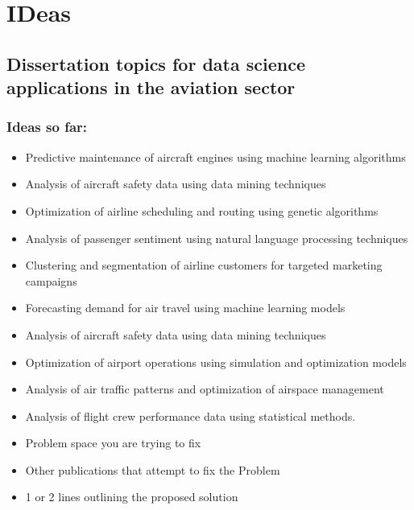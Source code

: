 \chapter{IDeas}

\section{Dissertation topics for data science applications in the aviation sector}

\subsection{Ideas so far:}
\begin{itemize}
    \item Predictive maintenance of aircraft engines using machine learning algorithms
    \item Analysis of aircraft safety data using data mining techniques
    \item Optimization of airline scheduling and routing using genetic algorithms
    \item Analysis of passenger sentiment using natural language processing techniques
    \item Clustering and segmentation of airline customers for targeted marketing campaigns
    \item Forecasting demand for air travel using machine learning models
    \item Analysis of aircraft safety data using data mining techniques
    \item Optimization of airport operations using simulation and optimization models
    \item Analysis of air traffic patterns and optimization of airspace management
    \item Analysis of flight crew performance data using statistical methods.
    \item Problem space you are trying to fix
    \item Other publications that attempt to fix the Problem
    \item 1 or 2 lines outlining the proposed solution
\end{itemize}




